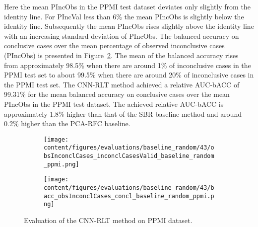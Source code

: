 Here the mean PIncObs in the PPMI test dataset deviates only slightly from the identity line.
For PIncVal less than 6\% the mean PIncObs is slightly below the identity line.
Subsequently the mean PIncObs rises slightly above the identity line with an increasing standard deviation of PIncObs.
The balanced accuracy on conclusive cases over the mean percentage of observed inconclusive cases (PIncObs) is presented 
in Figure~\ref{fig:bacc_obsInconclCases_concl_baseline_random_ppmi}.
The mean of the balanced accuracy rises from approximately 98.5\% 
when there are around 1\% of inconclusive cases in the PPMI test set to about 99.5\% 
when there are around 20\% of inconclusive cases in the PPMI test set.
The CNN-RLT method achieved a relative AUC-bACC of 99.31\% for the mean balanced accuracy on conclusive cases 
over the mean PIncObs in the PPMI test dataset.
The achieved relative AUC-bACC is approximately 1.8\% higher than that of the SBR baseline method 
and around 0.2\% higher than the PCA-RFC baseline.


\begin{figure}[ht]
  \begin{subfigure}{0.49\textwidth}
    \centering
    \texttt{[image: content/figures/evaluations/baseline\_random/43/obsInconclCases\_inconclCasesValid\_baseline\_random\_ppmi.png]}
    \label{fig:obsInconclCases_inconclCasesValid_baseline_random_ppmi}
  \end{subfigure}
  \hfill
  \begin{subfigure}{0.49\textwidth}
    \centering
    \texttt{[image: content/figures/evaluations/baseline\_random/43/bacc\_obsInconclCases\_concl\_baseline\_random\_ppmi.png]}
    \label{fig:bacc_obsInconclCases_concl_baseline_random_ppmi}
  \end{subfigure}
  \caption{Evaluation of the CNN-RLT method on PPMI dataset.}
  \label{fig:perf_eval_rlt_ppmi}
\end{figure}




